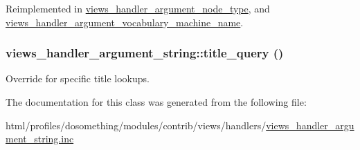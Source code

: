 Reimplemented in \hyperlink{classviews__handler__argument__node__type_ac17f7b9733895da68b132e6b97dcc917}{views\_\-handler\_\-argument\_\-node\_\-type}, and \hyperlink{classviews__handler__argument__vocabulary__machine__name_a97cd30f6f945568766976bc99f4812ae}{views\_\-handler\_\-argument\_\-vocabulary\_\-machine\_\-name}.\hypertarget{classviews__handler__argument__string_a2f90c113fcdf7c5f91ed3a11a0d5bc1c}{
\subsubsection[{title\_\-query}]{\setlength{\rightskip}{0pt plus 5cm}views\_\-handler\_\-argument\_\-string::title\_\-query ()}}
\label{classviews__handler__argument__string_a2f90c113fcdf7c5f91ed3a11a0d5bc1c}
Override for specific title lookups. 

The documentation for this class was generated from the following file:\begin{DoxyCompactItemize}
\item 
html/profiles/dosomething/modules/contrib/views/handlers/\hyperlink{views__handler__argument__string_8inc}{views\_\-handler\_\-argument\_\-string.inc}\end{DoxyCompactItemize}

